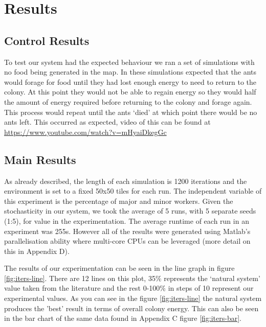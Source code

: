 \section{Results}
\subsection{Control Results}
To test our system had the expected behaviour we ran a set of simulations with no food being generated in the map. In these simulations expected that the ants would forage for food until they had lost enough energy to need to return to the colony. At this point they would not be able to regain energy so they would half the amount of energy required before returning to the colony and forage again. This process would repeat until the ants `died' at which point there would be no ants left. This occurred as expected, video of this can be found at \url{https://www.youtube.com/watch?v=mHyaiDkegGc}

\subsection{Main Results}

As already described, the length of each simulation is 1200 iterations and the environment is set to a fixed 50x50 tiles for each run. The independent variable of this experiment is the percentage of major and minor workers. Given the stochasticity in our system, we took the average of 5 runs, with 5 separate seeds (1:5), for value in the experimentation. The average runtime of each run in an experiment was 255\si{s}. However all of the results were generated using Matlab's parallelisation ability where multi-core CPUs can be leveraged (more detail on this in Appendix D).\par
The results of our experimentation can be seen in the line graph in figure \ref{fig:iters-line}. There are 12 lines on this plot, 35\% represents the `natural system' value taken from the literature \cite{Tschinkel1988} and the rest 0-100\% in steps of 10 represent our experimental values. As you can see in the figure \ref{fig:iters-line} the natural system produces the 'best' result in terms of overall colony energy. This can also be seen in the bar chart of the same data found in Appendix C figure \ref{fig:iters-bar}.\par

